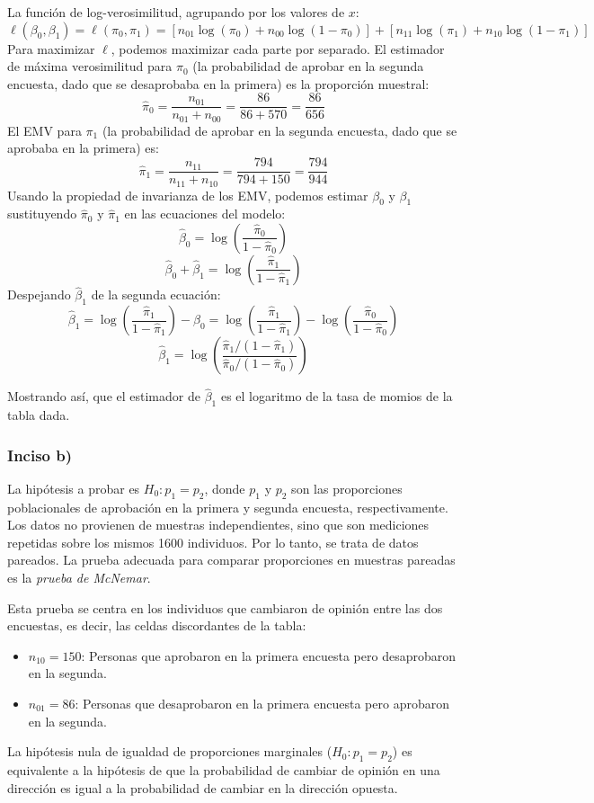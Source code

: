 \documentclass[paper=letter, fontsize=11pt]{scrartcl}\usepackage[]{graphicx}\usepackage[]{xcolor}
\numberwithin{equation}{problemcounter} %
\numberwithin{figure}{problemcounter} %
\numberwithin{table}{problemcounter} %
\numberwithin{subsection}{problemcounter}
\begin{document}
La función de log-verosimilitud, agrupando por los valores de $x$:
\[
\ell(\beta_0, \beta_1) = \ell(\pi_0, \pi_1) = [n_{01}\log(\pi_0) + n_{00}\log(1-\pi_0)] + [n_{11}\log(\pi_1) + n_{10}\log(1-\pi_1)]
\]
Para maximizar $\ell$, podemos maximizar cada parte por separado.
El estimador de máxima verosimilitud para $\pi_0$ (la probabilidad de aprobar en la segunda encuesta, dado que se desaprobaba en la primera) es la proporción muestral:
\[
\hat{\pi}_0 = \frac{n_{01}}{n_{01}+n_{00}} = \frac{86}{86+570} = \frac{86}{656}
\]
El EMV para $\pi_1$ (la probabilidad de aprobar en la segunda encuesta, dado que se aprobaba en la primera) es:
\[
\hat{\pi}_1 = \frac{n_{11}}{n_{11}+n_{10}} = \frac{794}{794+150} = \frac{794}{944}
\]
Usando la propiedad de invarianza de los EMV, podemos estimar $\beta_0$ y $\beta_1$ sustituyendo $\hat{\pi}_0$ y $\hat{\pi}_1$ en las ecuaciones del modelo:
\[
\hat{\beta}_0 = \log\left(\frac{\hat{\pi}_0}{1-\hat{\pi}_0}\right)
\]
\[
\hat{\beta}_0 + \hat{\beta}_1 = \log\left(\frac{\hat{\pi}_1}{1-\hat{\pi}_1}\right)
\]
Despejando $\hat{\beta}_1$ de la segunda ecuación:
\[
\hat{\beta}_1 = \log\left(\frac{\hat{\pi}_1}{1-\hat{\pi}_1}\right) - \hat{\beta}_0 = \log\left(\frac{\hat{\pi}_1}{1-\hat{\pi}_1}\right) - \log\left(\frac{\hat{\pi}_0}{1-\hat{\pi}_0}\right)
\]
\[
\hat{\beta}_1 = \log\left( \frac{\hat{\pi}_1/(1-\hat{\pi}_1)}{\hat{\pi}_0/(1-\hat{\pi}_0)} \right)
\]

Mostrando así, que el estimador de $\hat{\beta}_1$ es el logaritmo de la tasa de momios de la tabla dada.

\subsubsection*{Inciso b)}

La hipótesis a probar es $H_0: p_1 = p_2$, donde $p_1$ y $p_2$ son las proporciones poblacionales de aprobación en la primera y segunda encuesta, respectivamente.
Los datos no provienen de muestras independientes, sino que son mediciones repetidas sobre los mismos 1600 individuos. Por lo tanto, se trata de datos pareados. La prueba adecuada para comparar proporciones en muestras pareadas es la \textit{prueba de McNemar}.

Esta prueba se centra en los individuos que cambiaron de opinión entre las dos encuestas, es decir, las celdas discordantes de la tabla:
\begin{itemize}
    \item $n_{10} = 150$: Personas que aprobaron en la primera encuesta pero desaprobaron en la segunda.
    \item $n_{01} = 86$: Personas que desaprobaron en la primera encuesta pero aprobaron en la segunda.
\end{itemize}
La hipótesis nula de igualdad de proporciones marginales ($H_0: p_1 = p_2$) es equivalente a la hipótesis de que la probabilidad de cambiar de opinión en una dirección es igual a la probabilidad de cambiar en la dirección opuesta.
\end{document}
